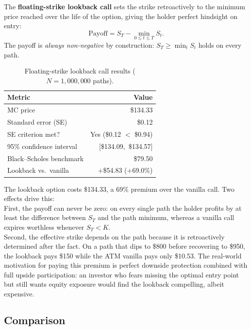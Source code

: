 \documentclass[12pt, a4paper]{article}
\begin{document}
The \textbf{floating-strike lookback call} sets the strike retroactively to the minimum
price reached over the life of the option, giving the holder perfect hindsight on entry:
\begin{equation}
    \text{Payoff} = S_T - \min_{0 \le t \le T} S_t.
    \label{eq:lookback}
\end{equation}
The payoff is \textit{always non-negative} by construction: $S_T \ge \min_{t} S_t$
holds on every path. 
\begin{table}[H]
\centering
\caption{Floating-strike lookback call results ($N = 1{,}000{,}000$ paths).}
\label{tab:lookback}
\begin{tabular}{lr}
\toprule
Metric & Value \\
\midrule
MC price                & \$134.33 \\
Standard error (SE)     & \$0.12 \\
SE criterion met?       & Yes (\$0.12 $<$ \$0.94) \\
95\% confidence interval & [\$134.09,\ \$134.57] \\
Black--Scholes benchmark & \$79.50 \\
Lookback vs.\ vanilla   & $+$\$54.83 ($+$69.0\%) \\
\bottomrule
\end{tabular}
\end{table}

The lookback option costs \$134.33, a 69\% premium over the vanilla call. Two effects
drive this: \\

First, the payoff can never be zero: on every single path the holder profits
by at least the difference between $S_T$ and the path minimum, whereas a vanilla call
expires worthless whenever $S_T < K$. \\

Second, the effective strike depends on the path because it is retroactively determined after the fact. On a path that dips to \$800 before recovering to \$950, the
lookback pays \$150 while the ATM vanilla pays only \$10.53. The real-world motivation for paying this premium is perfect downside protection combined with full upside participation: an investor who fears missing the optimal entry point but still wants equity exposure would find the lookback compelling, albeit expensive.

\subsection{Comparison}
\end{document}
